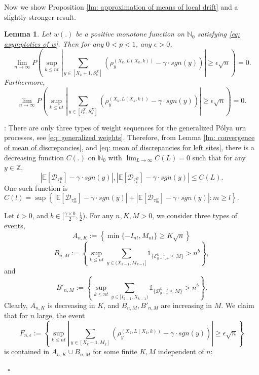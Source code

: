 \documentclass[twoside,12pt,a4paper]{article}
\newtheorem{lemma}{Lemma}[section]
\numberwithin{equation}{section}
\newenvironment{proof}[1][Proof]{{\sc #1}:}{~\hfill $\square$}
\newcommand{\abs}[1]{\left\vert #1 \right\vert}
\begin{document}
		Now we show Proposition \ref{lm: approximation of means of local drift} and a slightly stronger result. 
		\begin{lemma}
			Let $w(.)$ be a positive monotone function on $\mathbb{N}_0$ satisfying \eqref{eq: asymptotics of w}. Then for any $0<p<1$, any $\epsilon>0$,
			$$
			\lim_{n\to\infty} P\left( \sup_{k\leq n t}  \abs{  	\sum_{y\in [X_{k}+1 ,S_{k}^X]} \left( \rho^{(X_k,L(X_k,k))}_y -  \gamma \cdot sgn(y) \right) } \geq  \epsilon \sqrt{n}     \right) =0.
			$$
			Furthermore,
		$$
	\lim_{n\to\infty} P\left( \sup_{k\leq n t}  \abs{  	\sum_{y\in [I_k^{X} ,S_{k}^X]} \left( \rho^{(X_k,L(X_k,k))}_y -  \gamma \cdot sgn(y) \right) } \geq  \epsilon \sqrt{n}     \right) =0.
	$$
\end{lemma}
\begin{proof} There are only three types of weight sequences for the generalized P\'{o}lya urn processes, see \eqref{eq: generalized weights}. Therefore, from Lemma \ref{lm: convergence of mean of discrepancies}, and \eqref{eq: mean of discrepancies for left sites}, there is a decreasing function $C(.)$ on $\mathbb{N}_0$ with $\lim_{L\to \infty}C(L) =0$ such that for any $y \in \mathbb{Z}$,
	\begin{equation}\label{eq: uniform convergence}
		\abs{\mathbb{E}\left[ \mathcal{D}_{\tau_L^R} \right] - \gamma \cdot sgn(y)}, \abs{\mathbb{E}\left[ \mathcal{D}_{\tau_L^B} \right] - \gamma \cdot sgn(y)} \leq C(L).
	\end{equation} One such function is $C(l) = \sup \left\{  \abs{\mathbb{E}\left[ \mathcal{D}_{\tau_m^R} \right] - \gamma \cdot sgn(y)} + \abs{\mathbb{E}\left[ \mathcal{D}_{\tau_m^B} \right] - \gamma \cdot sgn(y)} : m\geq l \right\}.     $  
	
	
	Let $t>0$, and $b \in [\frac{\gamma \vee 0 }{2},\frac{1}{2})$.  For any $n,K,M>0$, we consider three types of events, 
	$$A_{n,K}:=\left\{ \min\{-I_{nt}, M_{nt}\} \geq K \sqrt{n}  \right\}$$
	$$B_{n,M}:= \left\{  \sup_{k\leq n t} \sum_{ y\in (X_{k-1}, M_{k-1}]}  \mathbb{1}_{\{ \mathcal{E}^{k-1}_{y-1,+} \leq M  \}} >n^b  \right\},  $$
	and 
	$$B'_{n,M}:=  \left\{  \sup_{k\leq n t} \sum_{ y\in [I_{k-1}, X_{k-1})}  \mathbb{1}_{\{ \mathcal{D}^{k-1}_{y+1} \leq M  \}} >n^b  \right\}.$$
Clearly, $A_{n,K}$ is decreasing in $K$, and $B_{n,M}, B'_{n,M}$ are increasing in $M$. We claim that for $n$ large, the event 
$$
F_{n,\epsilon}:= \left\{ \sup_{k\leq n t}  \abs{  	\sum_{y\in [X_{k}+1 ,M_k]} \left( \rho^{(X_k,L(X_k,k))}_y -  \gamma \cdot sgn(y) \right) } \geq  \epsilon \sqrt{n}    \right \}$$ is contained in $A_{n,K} \cup B_{n,M} $ for some finite $K, M$ independent of $n$:   


\end{proof}
\end{document}
